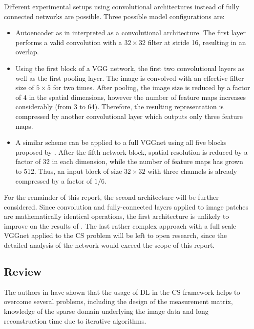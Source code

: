 \documentclass[10pt,twocolumn,a4paper]{article}
\begin{document}
Different experimental setups using convolutional architectures instead of fully connected networks are possible.
Three possible model configurations are:

\begin{itemize}
    \item 	Autoencoder as in \cite{Mousavi2015} interpreted as a convolutional architecture.
        	The first layer performs a valid convolution with a $32 \times 32$ filter at stride 16,
        	resulting in an overlap.
    \item 	Using the first block of a VGG network, \ie the first two convolutional layers as well as the first
    		pooling layer. The image is convolved with an effective filter size of $5 \times 5$ for two times.
    		After pooling, the image size is reduced by a factor of $4$ in the spatial dimensions, however the
    		number of feature maps increases considerably (from 3 to 64). Therefore, the resulting representation
    		is compressed by another convolutional layer which outputs only three feature maps.
    \item 	A similar scheme can be applied to a full VGGnet using all five blocks proposed by \cite{Simonyan14}.
    		After the fifth network block, spatial resolution is reduced by a factor of 32 in each dimension, while
    		the number of feature maps has grown to 512. Thus, an input block of size $32 \times 32$ with three channels
    		is already compressed by a factor of $1/6$.
\end{itemize}

For the remainder of this report, the second architecture will be further considered.
Since convolution and fully-connected layers applied to image patches are mathematically identical operations, the first architecture is unlikely to improve on the results of \cite{Mousavi2015}.
The last rather complex approach with a full scale VGGnet applied to the CS problem will be left to open research, since the detailed analysis of the network would exceed the scope of this report.

\subsection{Review}
The authors in \cite{Mousavi2015} have shown that the usage of DL in the CS framework helps to overcome several problems, including the design of the measurement matrix, knowledge of the sparse domain underlying the image data and long reconstruction time due to iterative algorithms.
\end{document}
